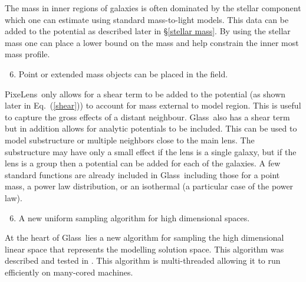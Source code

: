 \documentclass[galley,usenatbib]{mn2e}
\newcommand{\Glass}{{\sc Glass}}
\newcommand{\PixeLens}{{\sc PixeLens}}
\newcommand{\eqnref}[1] {Eq.~(\ref{#1})}
\newcommand{\secref}[1] {\S\ref{#1}}
\begin{document}
%
The mass in inner regions of galaxies is often dominated by the stellar component
which one can estimate using standard mass-to-light models. This data can be added
to the potential as described later in \secref{stellar mass}. By using the stellar
mass one can place a lower bound on the mass and help constrain the inner most
mass profile.
%
\begin{enumerate}
  \setcounter{enumi}{5}
  \item Point or extended mass objects can be placed in the field.
\end{enumerate}
%
\PixeLens\ only allows for a shear term to be added to the potential (as shown
later in \eqnref{shear}) to account for mass external to model region. This
is useful to capture the gross effects of a distant neighbour. \Glass\ also
has a shear term but in addition allows for analytic potentials to
be included. This can be used to model substructure or multiple neighbors close
to the main lens. The substructure may have only a small effect if the lens is
a single galaxy, but if the lens is a group then a potential can be added for
each of the galaxies. A few standard functions are already included in \Glass\
including those for a point mass, a power law distribution, or an isothermal (a
particular case of the power law).
%
\begin{enumerate}
  \setcounter{enumi}{5}
  \item A new uniform sampling algorithm for high dimensional spaces.
\end{enumerate}
%
At the heart of \Glass\ lies a new algorithm for sampling the high dimensional
linear space that represents the modelling solution space. This algorithm was
described and tested in \cite{2012MNRAS.425.3077L}. This algorithm is 
multi-threaded allowing it to run efficiently on many-cored machines.  
\end{document}
